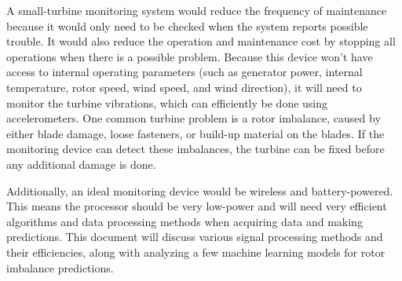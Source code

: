 A small-turbine monitoring system would reduce the frequency of maintenance because it would only need to be checked when the system reports possible trouble.  It would also reduce the operation and maintenance cost by stopping all operations when there is a possible problem.  Because this device won't have access to internal operating parameters (such as generator power, internal temperature, rotor speed, wind speed, and wind direction), it will need to monitor the turbine vibrations, which can efficiently be done using accelerometers.  One common turbine problem is a rotor imbalance, caused by either blade damage, loose fasteners, or build-up material on the blades.  If the monitoring device can detect these imbalances, the turbine can be fixed before any additional damage is done.

Additionally, an ideal monitoring device would be wireless and battery-powered.  This means the processor should be very low-power and will need very efficient algorithms and data processing methods when acquiring data and making predictions.  This document will discuss various signal processing methods and their efficiencies, along with analyzing a few machine learning models for rotor imbalance predictions.



